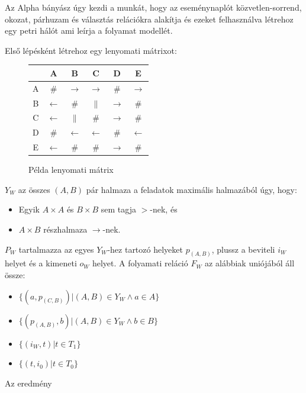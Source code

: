 Az Alpha bányász úgy kezdi a munkát, hogy az eseménynaplót közvetlen-sorrend, okozat, párhuzam és választás relációkra alakítja és ezeket felhasználva létrehoz egy petri hálót ami leírja a folyamat modellét.

Első lépésként létrehoz egy lenyomati mátrixot:

\begin{figure}[h!]
\begin{center}
\caption{Példa lenyomati mátrix}
\begin{tabular}{|c | c | c | c | c | c|}
	\hline
	\hspace{0.1cm} & A & B & C & D & E \\
	\hline
	A & \# & $\rightarrow$ & $\rightarrow$ & \# & $\rightarrow$ \\
	\hline
	B & $\leftarrow$ & \# & $\parallel$ & $\rightarrow$ & \# \\
	\hline
	C & $\leftarrow$ & $\parallel$ & \# & $\rightarrow$ & \# \\
	\hline
	D  & \# & $\leftarrow$ & $\leftarrow$ & \# & $\leftarrow$ \\
	\hline
	E & $\leftarrow$ & \# & \# & $\rightarrow$ & \# \\
	\hline
\end{tabular}
\label{fig:example}
\end{center}
\end{figure}

\newpage

\noindent $Y_W$ az összes $(A,B)$  pár halmaza a feladatok maximális halmazából úgy, hogy:
\begin{itemize}
	\item {Egyik $A \times A$ és $B \times B$ sem tagja $>$-nek, és}
	\item {$A \times B$ részhalmaza $\rightarrow$-nek.}
\end{itemize}
\noindent $P_W$ tartalmazza az egyes $Y_W$-hez tartozó helyeket $p_{(A,B)}$, plussz a beviteli $i_W$ helyet és a kimeneti $o_W$ helyet.
\noindent A folyamati reláció $F_W$ az alábbiak uniójából áll össze:
\begin{itemize}
\item $\{(a,p_{(C,B)})|(A,B) \in Y_W \wedge a \in A\}$
\item $\{(p_{(A,B)},b)|(A,B) \in Y_W \wedge b \in B\}$
\item $\{(i_W,t)|t \in T_1\}$
\item $\{(t,i_0)|t \in T_0\}$
\end{itemize}

\noindent Az eredmény

